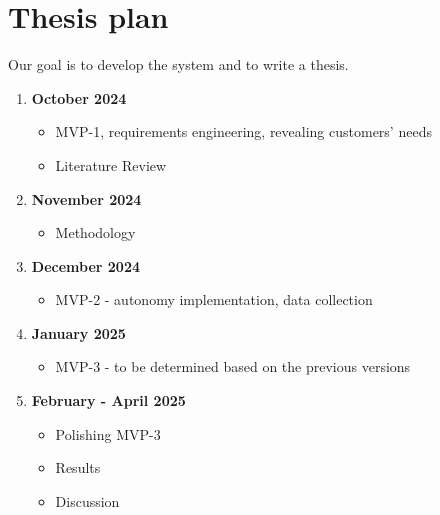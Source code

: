 \section*{Thesis plan}

Our goal is to develop the system and to write a thesis.

\begin{enumerate}
    \item \textbf{October 2024}
        \begin{itemize}
            \item MVP-1, requirements engineering, revealing customers' needs
            \item Literature Review
        \end{itemize}        
    \item \textbf{November 2024}
        \begin{itemize}
            \item Methodology
        \end{itemize}
    \item \textbf{December 2024}
        \begin{itemize}
            \item MVP-2 - autonomy implementation, data collection
        \end{itemize} 
    \item \textbf{January 2025}
        \begin{itemize}
            \item MVP-3 - to be determined based on the previous versions
        \end{itemize} 
    \item \textbf{February - April 2025}
        \begin{itemize}
            \item Polishing MVP-3
            \item Results
            \item Discussion
        \end{itemize} 
\end{enumerate}
